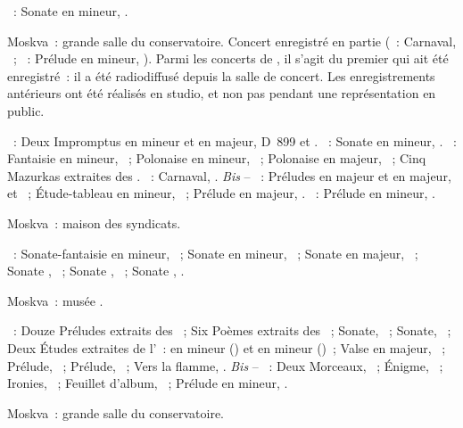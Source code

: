\begin{description}
 \textsc{\Beethoven{}}~: Sonate en \kC \Sharp mineur,  .
 \item[\DateWithWeekDay{1947-03-04}]
 Moskva~: grande salle du conservatoire.
 Concert enregistré en partie (\Schumann{}~: Carnaval, ~;
 \Scriabine{}~: Prélude en \kB mineur,  ).
 Parmi les concerts de \VSofronitsky{}, il s'agit du premier qui ait été
 enregistré~: il a été radiodiffusé depuis la salle de concert.
 Les enregistrements antérieurs ont été réalisés en studio, et non pas
 pendant une représentation en public.

 \textsc{\Schubert{}}~: Deux Impromptus en \kC mineur et en \kA \Flat
 majeur, D~899  et .
 \textsc{\Beethoven{}}~: Sonate en \kC \Sharp mineur,  .
 \textsc{\Chopin{}}~: Fantaisie en \kF mineur, ~; Polonaise en \kC
 \Sharp mineur,  ~; Polonaise en \kA majeur, 
 ~; Cinq Mazurkas extraites des .
 \textsc{\Schumann{}}~: Carnaval, .
 \emph{Bis} -- \textsc{\Rachmaninov{}}~: Préludes en \kE \Flat majeur et en
 \kE majeur,   et  ~; Étude-tableau en
 \kB mineur,  ~; Prélude en \kG majeur, 
 .
 \textsc{\Scriabine{}}~: Prélude en \kB mineur,  .
 \item[\DateWithWeekDay{1947-03-15}]
 Moskva~: maison des syndicats.

 \textsc{\Scriabine{}}~: Sonate-fantaisie  en \kG \Sharp mineur,
 ~; Sonate  en \kF \Sharp mineur, ~; Sonate
  en \kF \Sharp majeur, ~; Sonate , ~;
 Sonate , ~; Sonate , .
 \item[\DateWithWeekDay{1947-03-18}]
 Moskva~: musée \Scriabine{}.

 \textsc{\Scriabine{}}~: Douze Préludes extraits des ~; Six Poèmes extraits des ~; Sonate,
 ~; Sonate, ~; Deux Études extraites de l'~: en
 \kB \Flat mineur () et en \kB \Flat mineur ()~; Valse
 en \kA \Flat majeur, ~; Prélude,  ~; Prélude,
  ~; Vers la flamme, .
 \emph{Bis} -- \textsc{\Scriabine{}}~: Deux Morceaux, ~; Énigme,
  ~; Ironies,  ~; Feuillet d'album,
 ~; Prélude en \kF mineur,  .
 \item[\DateWithWeekDay{1947-03-26}]
 Moskva~: grande salle du conservatoire.


\end{description}
